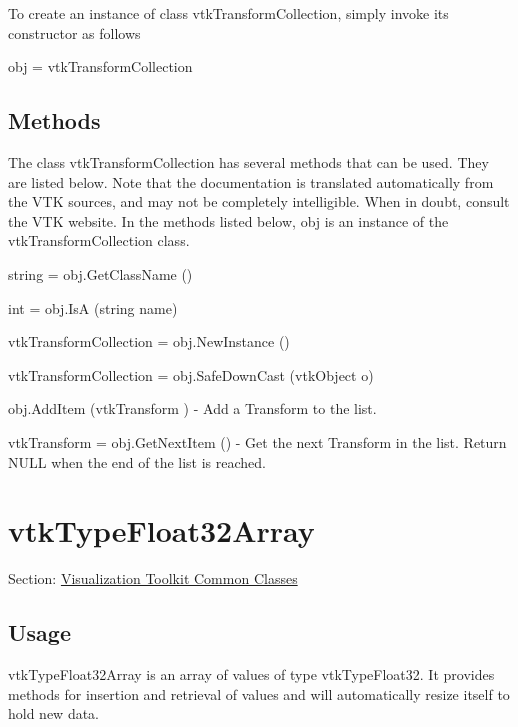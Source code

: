 To create an instance of class vtk\-Transform\-Collection, simply invoke its constructor as follows \begin{DoxyVerb}  obj = vtkTransformCollection
\end{DoxyVerb}
 \hypertarget{vtkwidgets_vtkxyplotwidget_Methods}{}\subsection{Methods}\label{vtkwidgets_vtkxyplotwidget_Methods}
The class vtk\-Transform\-Collection has several methods that can be used. They are listed below. Note that the documentation is translated automatically from the V\-T\-K sources, and may not be completely intelligible. When in doubt, consult the V\-T\-K website. In the methods listed below, {\ttfamily obj} is an instance of the vtk\-Transform\-Collection class. 
\begin{DoxyItemize}
\item {\ttfamily string = obj.\-Get\-Class\-Name ()}  
\item {\ttfamily int = obj.\-Is\-A (string name)}  
\item {\ttfamily vtk\-Transform\-Collection = obj.\-New\-Instance ()}  
\item {\ttfamily vtk\-Transform\-Collection = obj.\-Safe\-Down\-Cast (vtk\-Object o)}  
\item {\ttfamily obj.\-Add\-Item (vtk\-Transform )} -\/ Add a Transform to the list.  
\item {\ttfamily vtk\-Transform = obj.\-Get\-Next\-Item ()} -\/ Get the next Transform in the list. Return N\-U\-L\-L when the end of the list is reached.  
\end{DoxyItemize}\hypertarget{vtkcommon_vtktypefloat32array}{}\section{vtk\-Type\-Float32\-Array}\label{vtkcommon_vtktypefloat32array}
Section\-: \hyperlink{sec_vtkcommon}{Visualization Toolkit Common Classes} \hypertarget{vtkwidgets_vtkxyplotwidget_Usage}{}\subsection{Usage}\label{vtkwidgets_vtkxyplotwidget_Usage}
vtk\-Type\-Float32\-Array is an array of values of type vtk\-Type\-Float32. It provides methods for insertion and retrieval of values and will automatically resize itself to hold new data.

